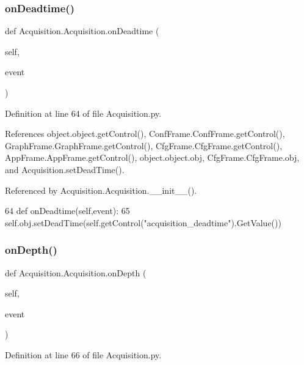 \subsubsection{\texorpdfstring{on\+Deadtime()}{onDeadtime()}}
{\footnotesize\ttfamily def Acquisition.\+Acquisition.\+on\+Deadtime (\begin{DoxyParamCaption}\item[{}]{self,  }\item[{}]{event }\end{DoxyParamCaption})}



Definition at line 64 of file Acquisition.\+py.



References object.\+object.\+get\+Control(), Conf\+Frame.\+Conf\+Frame.\+get\+Control(), Graph\+Frame.\+Graph\+Frame.\+get\+Control(), Cfg\+Frame.\+Cfg\+Frame.\+get\+Control(), App\+Frame.\+App\+Frame.\+get\+Control(), object.\+object.\+obj, Cfg\+Frame.\+Cfg\+Frame.\+obj, and Acquisition.\+set\+Dead\+Time().



Referenced by Acquisition.\+Acquisition.\+\_\+\+\_\+init\+\_\+\+\_\+().


\begin{DoxyCode}
64     \textcolor{keyword}{def }onDeadtime(self,event):
65         self.obj.setDeadTime(self.getControl(\textcolor{stringliteral}{"acquisition\_deadtime"}).GetValue())
\end{DoxyCode}
\mbox{\label{classAcquisition_1_1Acquisition_abd482f75a95cdcc9b55c5adb7c046ae3}} 
\subsubsection{\texorpdfstring{on\+Depth()}{onDepth()}}
{\footnotesize\ttfamily def Acquisition.\+Acquisition.\+on\+Depth (\begin{DoxyParamCaption}\item[{}]{self,  }\item[{}]{event }\end{DoxyParamCaption})}



Definition at line 66 of file Acquisition.\+py.



